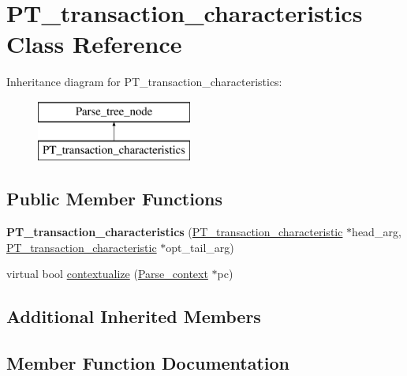 \hypertarget{classPT__transaction__characteristics}{}\section{P\+T\+\_\+transaction\+\_\+characteristics Class Reference}
\label{classPT__transaction__characteristics}
Inheritance diagram for P\+T\+\_\+transaction\+\_\+characteristics\+:\begin{figure}[H]
\begin{center}
\leavevmode
\includegraphics[height=2.000000cm]{classPT__transaction__characteristics}
\end{center}
\end{figure}
\subsection*{Public Member Functions}
\begin{DoxyCompactItemize}
\item 
\mbox{\label{classPT__transaction__characteristics_a47303f843149f8ba345ec4fdcecc9b1c}} 
{\bfseries P\+T\+\_\+transaction\+\_\+characteristics} (\mbox{\hyperlink{classPT__transaction__characteristic}{P\+T\+\_\+transaction\+\_\+characteristic}} $\ast$head\+\_\+arg, \mbox{\hyperlink{classPT__transaction__characteristic}{P\+T\+\_\+transaction\+\_\+characteristic}} $\ast$opt\+\_\+tail\+\_\+arg)
\item 
virtual bool \mbox{\hyperlink{classPT__transaction__characteristics_a6f73b4c891ed99b6ffaccb1abb4cb2e4}{contextualize}} (\mbox{\hyperlink{structParse__context}{Parse\+\_\+context}} $\ast$pc)
\end{DoxyCompactItemize}
\subsection*{Additional Inherited Members}


\subsection{Member Function Documentation}
\mbox{\label{classPT__transaction__characteristics_a6f73b4c891ed99b6ffaccb1abb4cb2e4}} 
